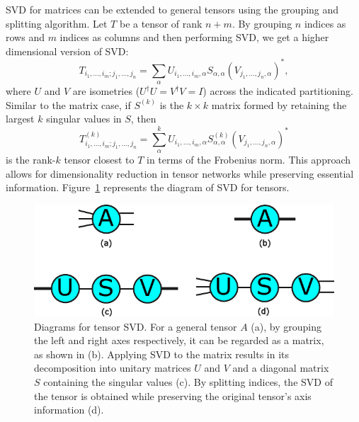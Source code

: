 \documentclass[12pt,dvipdfmx,twoside,openright]{report}
\begin{document}
SVD for matrices can be extended to general tensors using the grouping and splitting algorithm.
Let $T$ be a tensor of rank $n+m$.
By grouping $n$ indices as rows and $m$ indices as columns and then performing SVD, we get a higher dimensional version of SVD:
\begin{equation}
    T_{i_1,\dots,i_m;j_1,\dots,j_n}=\sum_\alpha U_{i_1,\dots,i_m,\alpha}S_{\alpha,\alpha} (V_{j_1,\dots,j_n,\alpha})^*,
\end{equation}
where $U$ and $V$ are isometries ($U^\dagger U=V^\dagger V=I$) across the indicated partitioning. %
Similar to the matrix case, if $S^{(k)}$ is the $k\times k$ matrix formed by retaining the largest $k$ singular values in $S$, then
\begin{equation}
    T_{i_1,\dots,i_m;j_1,\dots,j_n}^{(k)}=\sum_\alpha^k U_{i_1,\dots,i_m,\alpha}S_{\alpha,\alpha}^{(k)} (V_{j_1,\dots,j_n,\alpha})^*
\end{equation}
is the rank-$k$ tensor closest to $T$ in terms of the Frobenius norm.
This approach allows for dimensionality reduction in tensor networks while preserving essential information.
Figure~\ref{fig:svd} represents the diagram of SVD for tensors.
\begin{figure}
    \centering
    \includegraphics[width=0.7\linewidth]{fig-svd.pdf}
    \caption{Diagrams for tensor SVD.
    For a general tensor $A$ (a), by grouping the left and right axes respectively, it can be regarded as a matrix, as shown in (b). 
    Applying SVD to the matrix results in its decomposition into unitary matrices $U$ and $V$ and a diagonal matrix $S$ containing the singular values (c). 
    By splitting indices, the SVD of the tensor is obtained while preserving the original tensor's axis information (d).}
    \label{fig:svd}
\end{figure}
\end{document}
